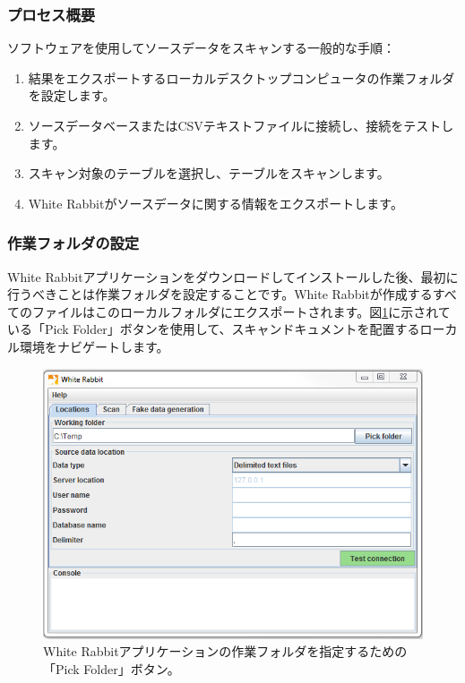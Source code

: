 \documentclass[
  11pt]{book}
\providecommand{\tightlist}{%
  \setlength{\itemsep}{0pt}\setlength{\parskip}{0pt}}
\theoremstyle{definition}
\theoremstyle{definition}
\theoremstyle{definition}
\theoremstyle{definition}
\theoremstyle{remark}
\begin{document}
\subsubsection*{プロセス概要}\label{ux30d7ux30edux30bbux30b9ux6982ux8981}

ソフトウェアを使用してソースデータをスキャンする一般的な手順：

\begin{enumerate}
\def\labelenumi{\arabic{enumi}.}
\tightlist
\item
  結果をエクスポートするローカルデスクトップコンピュータの作業フォルダを設定します。
\item
  ソースデータベースまたはCSVテキストファイルに接続し、接続をテストします。
\item
  スキャン対象のテーブルを選択し、テーブルをスキャンします。
\item
  White Rabbitがソースデータに関する情報をエクスポートします。
\end{enumerate}

\subsubsection*{作業フォルダの設定}\label{ux4f5cux696dux30d5ux30a9ux30ebux30c0ux306eux8a2dux5b9a}

White Rabbitアプリケーションをダウンロードしてインストールした後、最初に行うべきことは作業フォルダを設定することです。White Rabbitが作成するすべてのファイルはこのローカルフォルダにエクスポートされます。図\ref{fig:WhiteRabbitLocation}に示されている「Pick Folder」ボタンを使用して、スキャンドキュメントを配置するローカル環境をナビゲートします。

\begin{figure}

{\centering \includegraphics[width=1\linewidth]{images/ExtractTransformLoad/WhiteRabbitLocation} 

}

\caption{White Rabbitアプリケーションの作業フォルダを指定するための「Pick Folder」ボタン。}\label{fig:WhiteRabbitLocation}
\end{figure}
\end{document}
